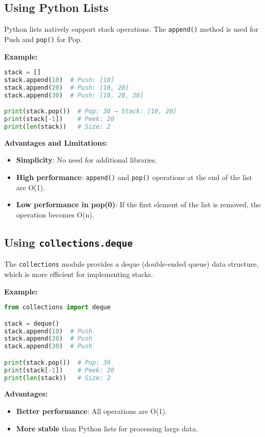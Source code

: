 \documentclass{article}
\begin{document}
\subsection{Using Python Lists}

Python lists natively support stack operations. The \texttt{append()} method is used for Push and \texttt{pop()} for Pop.

\textbf{Example:}

\begin{lstlisting}[language=Python]
stack = []
stack.append(10)  # Push: [10]
stack.append(20)  # Push: [10, 20]
stack.append(30)  # Push: [10, 20, 30]

print(stack.pop())  # Pop: 30 → Stack: [10, 20]
print(stack[-1])    # Peek: 20
print(len(stack))   # Size: 2
\end{lstlisting}

\textbf{Advantages and Limitations:}

\begin{itemize}
    \item \textbf{Simplicity}: No need for additional libraries.
    \item \textbf{High performance}: \texttt{append()} and \texttt{pop()} operations at the end of the list are O(1).
    \item \textbf{Low performance in pop(0)}: If the first element of the list is removed, the operation becomes O(n).
\end{itemize}

\subsection{Using \texttt{collections.deque}}

The \texttt{collections} module provides a deque (double-ended queue) data structure, which is more efficient for implementing stacks.

\textbf{Example:}

\begin{lstlisting}[language=Python]
from collections import deque

stack = deque()
stack.append(10)  # Push
stack.append(20)  # Push
stack.append(30)  # Push

print(stack.pop())  # Pop: 30
print(stack[-1])    # Peek: 20
print(len(stack))   # Size: 2
\end{lstlisting}

\textbf{Advantages:}

\begin{itemize}
    \item \textbf{Better performance}: All operations are O(1).
    \item \textbf{More stable} than Python lists for processing large data.
\end{itemize}
\end{document}
